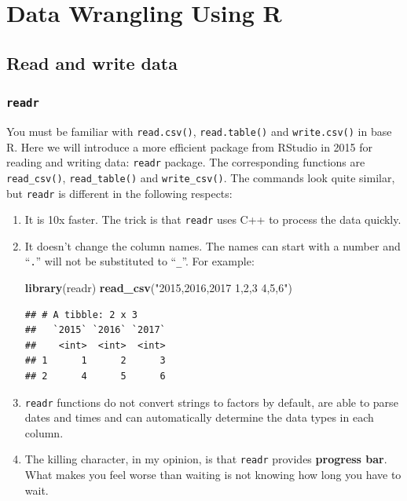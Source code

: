 \documentclass[12pt,]{krantz}
\newenvironment{Shaded}{\begin{snugshade}}{\end{snugshade}}
\newcommand{\KeywordTok}[1]{\textcolor[rgb]{0.13,0.29,0.53}{\textbf{{#1}}}}
\newcommand{\StringTok}[1]{\textcolor[rgb]{0.31,0.60,0.02}{{#1}}}
\newcommand{\NormalTok}[1]{{#1}}
\theoremstyle{definition}
\theoremstyle{definition}
\theoremstyle{remark}
\begin{document}
\section{Data Wrangling Using R}\label{data-wrangling-using-r}

\subsection{Read and write data}\label{read-and-write-data}

\subsubsection{\texorpdfstring{\texttt{readr}}{readr}}\label{readr}

You must be familiar with \texttt{read.csv()}, \texttt{read.table()} and
\texttt{write.csv()} in base R. Here we will introduce a more efficient
package from RStudio in 2015 for reading and writing data:
\texttt{readr} package. The corresponding functions are
\texttt{read\_csv()}, \texttt{read\_table()} and \texttt{write\_csv()}.
The commands look quite similar, but \texttt{readr} is different in the
following respects:

\begin{enumerate}
\def\labelenumi{\arabic{enumi}.}
\item
  It is 10x faster. The trick is that \texttt{readr} uses C++ to process
  the data quickly.
\item
  It doesn't change the column names. The names can start with a number
  and ``\texttt{.}'' will not be substituted to ``\texttt{\_}''. For
  example:

\begin{Shaded}
\begin{Highlighting}[]
\KeywordTok{library}\NormalTok{(readr)}
\KeywordTok{read_csv}\NormalTok{(}\StringTok{"2015,2016,2017}
\StringTok{1,2,3}
\StringTok{4,5,6"}\NormalTok{)}
\end{Highlighting}
\end{Shaded}

\begin{verbatim}
## # A tibble: 2 x 3
##   `2015` `2016` `2017`
##    <int>  <int>  <int>
## 1      1      2      3
## 2      4      5      6
\end{verbatim}
\item
  \texttt{readr} functions do not convert strings to factors by default,
  are able to parse dates and times and can automatically determine the
  data types in each column.
\item
  The killing character, in my opinion, is that \texttt{readr} provides
  \textbf{progress bar}. What makes you feel worse than waiting is not
  knowing how long you have to wait.
\end{enumerate}
\end{document}

